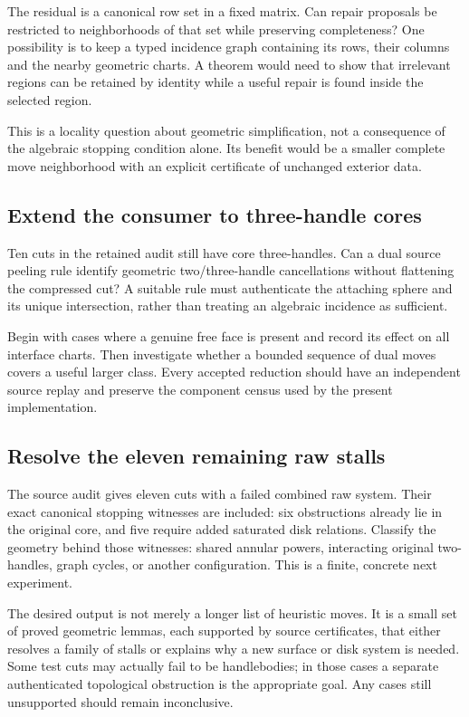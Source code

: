 The residual is a canonical row set in a fixed matrix. Can repair proposals
be restricted to neighborhoods of that set while preserving completeness?
One possibility is to keep a typed incidence graph containing its rows,
their columns and the nearby geometric charts. A theorem would need to
show that irrelevant regions can be retained by identity while a useful
repair is found inside the selected region.

This is a locality question about geometric simplification, not a
consequence of the algebraic stopping condition alone. Its benefit would
be a smaller complete move neighborhood with an explicit certificate of
unchanged exterior data.

\subsection{Extend the consumer to three-handle cores}

Ten cuts in the retained audit still have core three-handles. Can a dual
source peeling rule identify geometric two/three-handle cancellations
without flattening the compressed cut? A suitable rule must authenticate
the attaching sphere and its unique intersection, rather than treating
an algebraic incidence as sufficient.

Begin with cases where a genuine free face is present and record its
effect on all interface charts. Then investigate whether a bounded
sequence of dual moves covers a useful larger class. Every accepted
reduction should have an independent source replay and preserve the
component census used by the present implementation.

\subsection{Resolve the eleven remaining raw stalls}

The source audit gives eleven cuts with a failed combined raw system.
Their exact canonical stopping witnesses are included: six obstructions
already lie in the original core, and five require added saturated disk
relations. Classify the geometry behind those witnesses: shared annular
powers, interacting original two-handles, graph cycles, or another
configuration. This is a finite, concrete next experiment.

The desired output is not merely a longer list of heuristic moves. It
is a small set of proved geometric lemmas, each supported by source
certificates, that either resolves a family of stalls or explains why
a new surface or disk system is needed. Some test cuts may actually
fail to be handlebodies; in those cases a separate authenticated
topological obstruction is the appropriate goal. Any cases still
unsupported should remain inconclusive.

